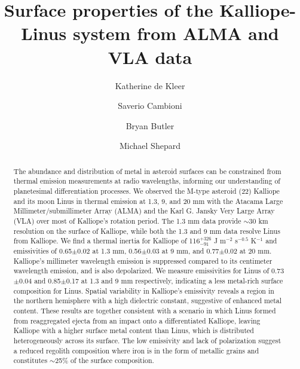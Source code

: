 \documentclass[]{aastex631}
\begin{document}
\title{Surface properties of the Kalliope-Linus system from ALMA and VLA data}

\author[0000-0002-9068-3428]{Katherine de Kleer}

\author[0000-0001-6294-4523]{Saverio Cambioni}

\author[0000-0002-5344-820X]{Bryan Butler}

\author[0000-0002-8441-2488]{Michael Shepard}

\begin{abstract}

The abundance and distribution of metal in asteroid surfaces can be constrained from thermal emission measurements at radio wavelengths, informing our understanding of planetesimal differentiation processes. We observed the M-type asteroid (22) Kalliope and its moon Linus in thermal emission at 1.3, 9, and 20 mm with the Atacama Large Millimeter/submillimeter Array (ALMA) and the Karl G. Jansky Very Large Array (VLA) over most of Kalliope’s rotation period. The 1.3 mm data provide $\sim$30 km resolution on the surface of Kalliope, while both the 1.3 and 9 mm data resolve Linus from Kalliope. We find a thermal inertia for Kalliope of 116$^{+326}_{-91}$ J m$^{-2}$ s$^{-0.5}$ K$^{-1}$ and emissivities of 0.65$\pm$0.02 at 1.3 mm, 0.56$\pm$0.03 at 9 mm, and 0.77$\pm$0.02 at 20 mm. Kalliope’s millimeter wavelength emission is suppressed compared to its centimeter wavelength emission, and is also depolarized. We measure emissivities for Linus of 0.73$\pm$0.04 and 0.85$\pm$0.17 at 1.3 and 9 mm respectively, indicating a less metal-rich surface composition for Linus. Spatial variability in Kalliope's emissivity reveals a region in the northern hemisphere with a high dielectric constant, suggestive of enhanced metal content. These results are together consistent with a scenario in which Linus formed from reaggregated ejecta from an impact onto a differentiated Kalliope, leaving Kalliope with a higher surface metal content than Linus, which is distributed heterogeneously across its surface. The low emissivity and lack of polarization suggest a reduced regolith composition where iron is in the form of metallic grains and constitutes $\sim$25\% of the surface composition. 

\end{abstract}
\end{document}
